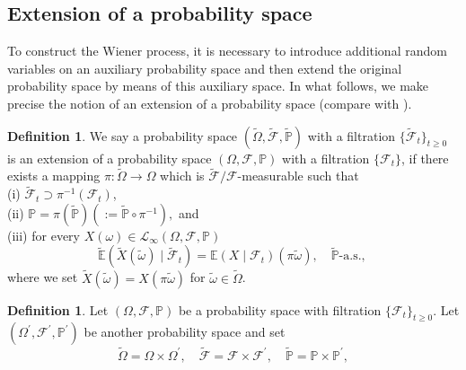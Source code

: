 \documentclass[english,a4paper,11pt]{amsart}
\theoremstyle{plain}
\theoremstyle{definition}
\newtheorem{definition}[theorem]{Definition}
\theoremstyle{remark}
\numberwithin{equation}{section}
\newcommand{\PP}{{\mathbb{P}}}
\newcommand{\EE}{ \mathbb{E} }
\begin{document}
	\begin{appendix}
	\renewcommand{\thesection}{\Alph{section}}


\section{Extension of a probability  space}\label{extension}



To construct the Wiener process, it is necessary to introduce additional random variables on an auxiliary probability space and then extend the original probability space by means of this auxiliary space.
In what follows, we make precise the notion of an extension of a probability space (compare with \cite{Ikeda}).

\begin{definition}
	\label{Definition7.1.} We say a probability space $(\widetilde{\Omega}, \widetilde{\mathscr{F}}, \widetilde{\mathbb{P}} )$ with a filtration $\{\widetilde{\mathscr{F}}_{t}\}_{t\ge 0}$ is an extension of a probability space $(\Omega, \mathscr{F}, \mathbb{P})$ with a  filtration $\{\mathscr{F}_{t}\}$,  if there exists a mapping $\pi: \widetilde{\Omega} \longrightarrow \Omega$ which is $\widetilde{\mathscr{F}} / \mathscr{F}$-measurable such that\\
	(i) $\widetilde{\mathscr{F}}_{t} \supset \pi^{-1}\left(\mathscr{F}_{t}\right)$,\\
	(ii) $\mathbb{P}=\pi(\widetilde{\mathbb{P}})(:=\widetilde{\mathbb{P}} \circ \pi^{-1}), $ and\\
	(iii) for every $X(\omega) \in \mathscr{L}_{\infty}(\Omega, \mathscr{F}, \mathbb{P})$
	$$
	\widetilde{\EE}\left(\widetilde{X}(\widetilde{\omega}) \mid \widetilde{\mathscr{F}}_{t}\right)=\EE\left(X \mid \mathscr{F}_{t}\right)(\pi \widetilde{\omega}), \quad \widetilde{\PP} \text {-a.s., }
	$$
	where we set $\widetilde{X}(\widetilde{\omega})=X(\pi \widetilde{\omega})$ for $\widetilde{\omega} \in \widetilde{\Omega}$.
\end{definition}
%
\begin{definition}
	\label{Definition_extension}  Let $(\Omega, \mathscr{F}, \mathbb{P})$ be a probability space with  filtration $\{\mathscr{F}_{t}\}_{t\ge 0}$. Let $\left(\Omega^{\prime}, \mathscr{F}^{\prime}, \PP^{\prime}\right)$ be another probability space and set
	$$
	\widetilde{\Omega}=\Omega \times \Omega^{\prime}, \quad \widetilde{\mathscr{F}}=\mathscr{F} \times \mathscr{F}^{\prime}, \quad \widetilde{\mathbb{P}}=\mathbb{P} \times \mathbb{P}^{\prime},
$$
\end{definition}
\end{appendix}
\end{document}
